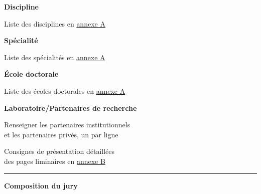 \vspace{4em}

\begin{center}
	\begin{minipage}[t]{.45\linewidth}
    	    \vspace{.5em}
        	\textsf{\textbf{Discipline}}
        	
        	\textsf{Liste des disciplines en \hyperref[chap:doctorats]{annexe A}}
        	
    	    \vspace{1em}
        	\textsf{\textbf{Spécialité}}
        	
        	\textsf{Liste des spécialités en \hyperref[chap:doctorats]{annexe A}}
        	
    	    \vspace{2em}
        	\textsf{\textbf{École doctorale}}
        	
        	\textsf{Liste des écoles doctorales en \hyperref[chap:doctorats]{annexe A}}
        	
    	    \vspace{1em}
        	\textsf{\textbf{Laboratoire/Partenaires de recherche}}
        	
        	\textsf{Renseigner les partenaires institutionnels\\
        	et les partenaires privés, un par ligne
        	}

    	    \vspace{3em}
        	\textsf{Consignes de présentation détaillées\\
			des pages liminaires en \hyperref[chap:consignes]{annexe B}}
	\end{minipage}\hfill
	\begin{minipage}[t]{.03\linewidth}
	    \rule[-280pt]{1pt}{280pt}
	\end{minipage}\hfill
	\begin{minipage}[t]{.52\linewidth}
	    \vspace{.5em}
    	\textsf{\textbf{Composition du jury}}


\end{minipage}
\end{center}

